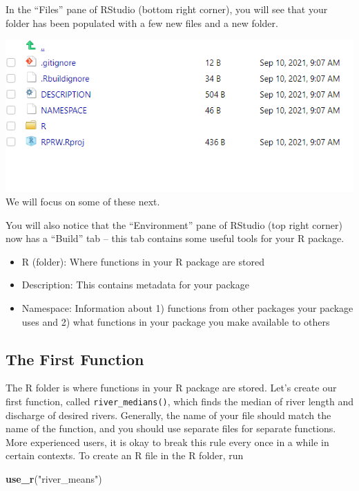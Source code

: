 \documentclass[
]{book}
\newenvironment{Shaded}{\begin{snugshade}}{\end{snugshade}}
\newcommand{\KeywordTok}[1]{\textcolor[rgb]{0.13,0.29,0.53}{\textbf{#1}}}
\newcommand{\NormalTok}[1]{#1}
\newcommand{\StringTok}[1]{\textcolor[rgb]{0.31,0.60,0.02}{#1}}
\providecommand{\tightlist}{%
  \setlength{\itemsep}{0pt}\setlength{\parskip}{0pt}}
\begin{document}
In the ``Files'' pane of RStudio (bottom right corner), you will see that your folder has been populated with a few new files and a new folder.

\includegraphics[width=1\linewidth]{images/newrpack_files}
We will focus on some of these next.

You will also notice that the ``Environment'' pane of RStudio (top right corner) now has a ``Build'' tab -- this tab contains some useful tools for your R package.

\begin{itemize}
\tightlist
\item
  R (folder): Where functions in your R package are stored
\item
  Description: This contains metadata for your package
\item
  Namespace: Information about 1) functions from other packages your package uses and 2) what functions in your package you make available to others
\end{itemize}

\hypertarget{the-first-function}{%
\subsection{The First Function}\label{the-first-function}}

The R folder is where functions in your R package are stored. Let's create our first function, called \texttt{river\_medians()}, which finds the median of river length and discharge of desired rivers. Generally, the name of your file should match the name of the function, and you should use separate files for separate functions. More experienced users, it is okay to break this rule every once in a while in certain contexts. To create an R file in the R folder, run

\begin{Shaded}
\begin{Highlighting}[]
\KeywordTok{use_r}\NormalTok{(}\StringTok{"river_means"}\NormalTok{)}
\end{Highlighting}
\end{Shaded}
\end{document}
